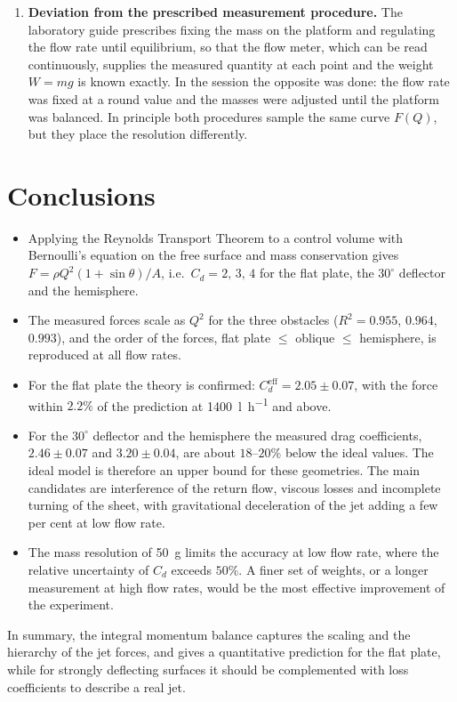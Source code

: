 \documentclass[11pt,a4paper]{article}
\numberwithin{equation}{section}
\newcommand{\Cd}{C_d}
\begin{document}
\begin{enumerate}[leftmargin=1.5em, itemsep=0.4em]
 \item \textbf{Deviation from the prescribed measurement procedure.} The laboratory guide prescribes fixing the mass on the platform and regulating the flow rate until equilibrium, so that the flow meter, which can be read continuously, supplies the measured quantity at each point and the weight $W=mg$ is known exactly. In the session the opposite was done: the flow rate was fixed at a round value and the masses were adjusted until the platform was balanced. In principle both procedures sample the same curve $F(Q)$, but they place the resolution differently.
\end{enumerate}

\section{Conclusions}

\begin{itemize}[leftmargin=1.5em, itemsep=0.3em]
  \item Applying the Reynolds Transport Theorem to a control volume with Bernoulli's equation on the free surface and mass conservation gives $F=\rho Q^2(1+\sin\theta)/A$, i.e.\ $\Cd=2,\,3,\,4$ for the flat plate, the $30^\circ$ deflector and the hemisphere.
  \item The measured forces scale as $Q^2$ for the three obstacles ($R^2=0.955$, $0.964$, $0.993$), and the order of the forces, flat plate $\le$ oblique $\le$ hemisphere, is reproduced at all flow rates.
  \item For the flat plate the theory is confirmed: $\Cd^{\mathrm{eff}}=2.05\pm0.07$, with the force within $2.2\%$ of the prediction at \SI{1400}{\litre\per\hour} and above.
  \item For the $30^\circ$ deflector and the hemisphere the measured drag coefficients, $2.46\pm0.07$ and $3.20\pm0.04$, are about $18$--$20\%$ below the ideal values. The ideal model is therefore an upper bound for these geometries. The main candidates are interference of the return flow, viscous losses and incomplete turning of the sheet, with gravitational deceleration of the jet adding a few per cent at low flow rate.
  \item The mass resolution of \SI{50}{\gram} limits the accuracy at low flow rate, where the relative uncertainty of $\Cd$ exceeds $50\%$. A finer set of weights, or a longer measurement at high flow rates, would be the most effective improvement of the experiment.
\end{itemize}
In summary, the integral momentum balance captures the scaling and the hierarchy of the jet forces, and gives a quantitative prediction for the flat plate, while for strongly deflecting surfaces it should be complemented with loss coefficients to describe a real jet.
\end{document}
